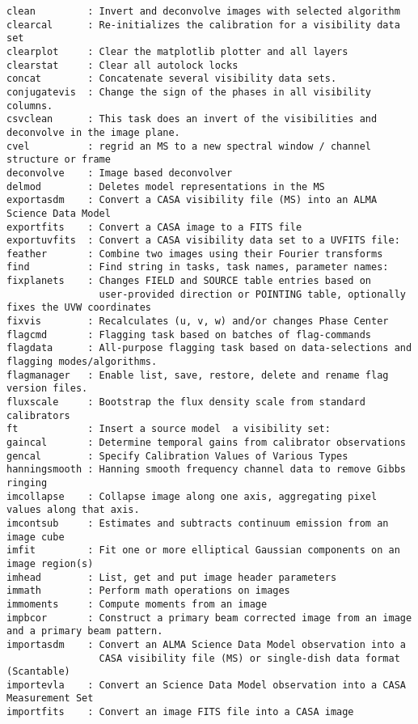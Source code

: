 \begin{verbatim}
clean         : Invert and deconvolve images with selected algorithm
clearcal      : Re-initializes the calibration for a visibility data set
clearplot     : Clear the matplotlib plotter and all layers
clearstat     : Clear all autolock locks
concat        : Concatenate several visibility data sets.
conjugatevis  : Change the sign of the phases in all visibility columns.
csvclean      : This task does an invert of the visibilities and deconvolve in the image plane.
cvel          : regrid an MS to a new spectral window / channel structure or frame
deconvolve    : Image based deconvolver
delmod        : Deletes model representations in the MS
exportasdm    : Convert a CASA visibility file (MS) into an ALMA Science Data Model
exportfits    : Convert a CASA image to a FITS file
exportuvfits  : Convert a CASA visibility data set to a UVFITS file:
feather       : Combine two images using their Fourier transforms
find          : Find string in tasks, task names, parameter names:
fixplanets    : Changes FIELD and SOURCE table entries based on
                user-provided direction or POINTING table, optionally fixes the UVW coordinates
fixvis        : Recalculates (u, v, w) and/or changes Phase Center 
flagcmd       : Flagging task based on batches of flag-commands
flagdata      : All-purpose flagging task based on data-selections and flagging modes/algorithms.
flagmanager   : Enable list, save, restore, delete and rename flag version files.
fluxscale     : Bootstrap the flux density scale from standard calibrators
ft            : Insert a source model  a visibility set:
gaincal       : Determine temporal gains from calibrator observations
gencal        : Specify Calibration Values of Various Types
hanningsmooth : Hanning smooth frequency channel data to remove Gibbs ringing
imcollapse    : Collapse image along one axis, aggregating pixel values along that axis.
imcontsub     : Estimates and subtracts continuum emission from an image cube
imfit         : Fit one or more elliptical Gaussian components on an image region(s)
imhead        : List, get and put image header parameters
immath        : Perform math operations on images
immoments     : Compute moments from an image
impbcor       : Construct a primary beam corrected image from an image and a primary beam pattern.
importasdm    : Convert an ALMA Science Data Model observation into a
                CASA visibility file (MS) or single-dish data format (Scantable)
importevla    : Convert an Science Data Model observation into a CASA Measurement Set
importfits    : Convert an image FITS file into a CASA image

\end{verbatim}
